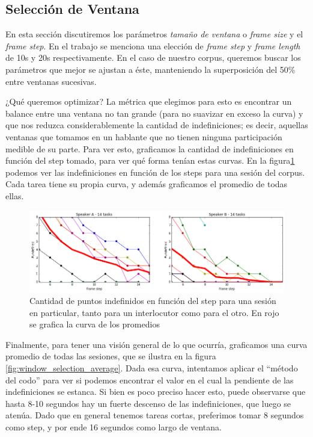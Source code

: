 \subsection{Selección de Ventana}
\label{sec:window_selection}

En esta sección discutiremos los parámetros \emph{tamaño de ventana} o \emph{frame size} y el \emph{frame step}. En el trabajo \cite{KOU2008.2} se menciona una elección de \emph{frame step} y \emph{frame length} de 10s y 20s respectivamente. En el caso de nuestro corpus, queremos buscar los parámetros que mejor se ajustan a éste, manteniendo la superposición del 50\% entre ventanas sucesivas.

¿Qué queremos optimizar? La métrica que elegimos para esto es encontrar un balance entre una ventana no tan grande (para no suavizar en exceso la curva) y que nos reduzca considerablemente la cantidad de indefiniciones; es decir, aquellas ventanas que tomamos en un hablante que no tienen ninguna participación medible de su parte. Para ver esto, graficamos la cantidad de indefiniciones en función del step tomado, para ver qué forma tenían estas curvas. En la figura\ref{fig:window_selection_session} podemos ver las indefiniciones en función de los steps para una sesión del corpus. Cada tarea tiene su propia curva, y además graficamos el promedio de todas ellas.

\begin{figure}
\centering
\includegraphics[width=15cm]{images/window_selection_for_session.png}
\caption{Cantidad de puntos indefinidos en función del step para una sesión en particular, tanto para un interlocutor como para el otro. En rojo se grafica la curva de los promedios}
\label{fig:window_selection_session}
\end{figure}

Finalmente, para tener una visión general de lo que ocurría, graficamos una curva promedio de todas las sesiones, que se ilustra en la figura \ref{fig:window_selection_average}. Dada esa curva, intentamos aplicar el ``método del codo'' para ver si podemos encontrar el valor en el cual la pendiente de las indefiniciones se estanca. Si bien es poco preciso hacer esto, puede observarse que hasta 8-10 segundos hay un fuerte descenso de las indefiniciones, que luego se atenúa. Dado que en general tenemos tareas cortas, preferimos tomar 8 segundos como step, y por ende 16 segundos como largo de ventana.

